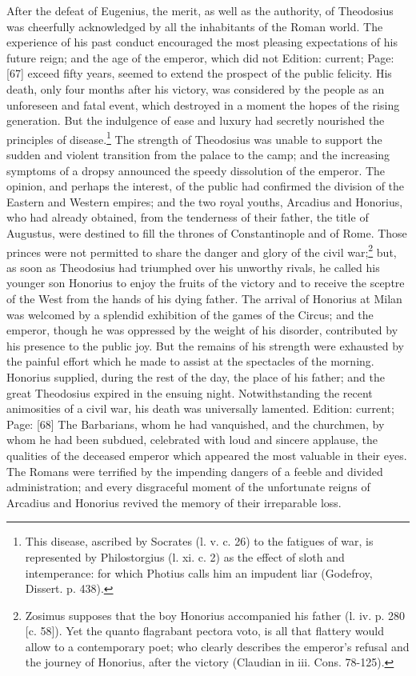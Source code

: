 After the defeat of Eugenius, the merit, as well as the authority, of Theodosius was cheerfully acknowledged by all the inhabitants of the Roman world. The experience of his past conduct encouraged the most pleasing expectations of his future reign; and the age of the emperor, which did not Edition: current; Page: [67] exceed fifty years, seemed to extend the prospect of the public felicity. His death, only four months after his victory, was considered by the people as an unforeseen and fatal event, which destroyed in a moment the hopes of the rising generation. But the indulgence of ease and luxury had secretly nourished the principles of disease.\footnote{This disease, ascribed by Socrates (l. v. c. 26) to the fatigues of war, is represented by Philostorgius (l. xi. c. 2) as the effect of sloth and intemperance: for which Photius calls him an impudent liar (Godefroy, Dissert. p. 438).} The strength of Theodosius was unable to support the sudden and violent transition from the palace to the camp; and the increasing symptoms of a dropsy announced the speedy dissolution of the emperor. The opinion, and perhaps the interest, of the public had confirmed the division of the Eastern and Western empires; and the two royal youths, Arcadius and Honorius, who had already obtained, from the tenderness of their father, the title of Augustus, were destined to fill the thrones of Constantinople and of Rome. Those princes were not permitted to share the danger and glory of the civil war;\footnote{Zosimus supposes that the boy Honorius accompanied his father (l. iv. p. 280 [c. 58]). Yet the quanto flagrabant pectora voto, is all that flattery would allow to a contemporary poet; who clearly describes the emperor\texthebrew{}’s refusal and the journey of Honorius, after the victory (Claudian in iii. Cons. 78-125).} but, as soon as Theodosius had triumphed over his unworthy rivals, he called his younger son Honorius to enjoy the fruits of the victory and to receive the sceptre of the West from the hands of his dying father. The arrival of Honorius at Milan was welcomed by a splendid exhibition of the games of the Circus; and the emperor, though he was oppressed by the weight of his disorder, contributed by his presence to the public joy. But the remains of his strength were exhausted by the painful effort which he made to assist at the spectacles of the morning. Honorius supplied, during the rest of the day, the place of his father; and the great Theodosius expired in the ensuing night. Notwithstanding the recent animosities of a civil war, his death was universally lamented. Edition: current; Page: [68] The Barbarians, whom he had vanquished, and the churchmen, by whom he had been subdued, celebrated with loud and sincere applause, the qualities of the deceased emperor which appeared the most valuable in their eyes. The Romans were terrified by the impending dangers of a feeble and divided administration; and every disgraceful moment of the unfortunate reigns of Arcadius and Honorius revived the memory of their irreparable loss.

